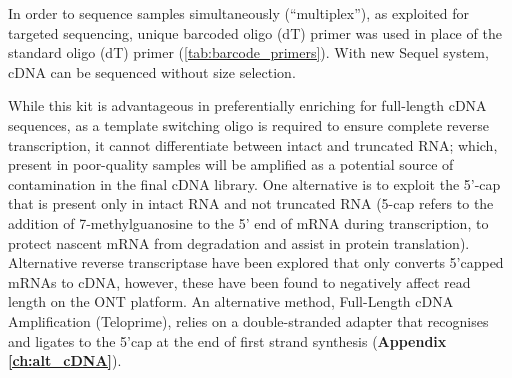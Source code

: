 In order to sequence samples simultaneously (“multiplex”), as exploited for targeted sequencing, unique barcoded oligo (dT) primer was used in place of the standard oligo (dT) primer (\cref{tab:barcode_primers}). With new Sequel system, cDNA can be sequenced without size selection.

While this kit is advantageous in preferentially enriching for full-length cDNA sequences, as a template switching oligo is required to ensure complete reverse transcription, it cannot differentiate between intact and truncated RNA; which, present in poor-quality samples will be amplified as a potential source of contamination in the final cDNA library. One alternative is to exploit the 5’-cap that is present only in intact RNA and not truncated RNA (5-cap refers to the addition of 7-methylguanosine to the 5’ end of mRNA during transcription, to protect nascent mRNA from degradation and assist in protein translation). Alternative reverse transcriptase have been explored that only converts 5’capped mRNAs to cDNA, however, these have been found to negatively affect read length on the ONT platform\cite{Cartolano2016}. An alternative method, Full-Length cDNA Amplification (Teloprime)\cite{Cartolano2016}, relies on a double-stranded adapter that recognises and ligates to the 5’cap at the end of first strand synthesis (\textbf{Appendix \ref{ch:alt_cDNA}}).

